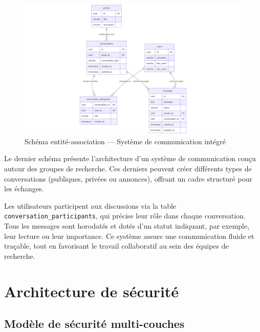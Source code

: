 \documentclass[12pt]{rapportPfe}
\begin{document}
\begin{figure}[H]
    \centering
    \includegraphics[width=1.0\textwidth]{diagrams/diagram8.png}
    \caption{Schéma entité-association — Système de communication intégré}
    \label{fig:diagram8}
\end{figure}

Le dernier schéma présente l’architecture d’un système de communication conçu autour des groupes de recherche. Ces derniers peuvent créer différents types de conversations (publiques, privées ou annonces), offrant un cadre structuré pour les échanges. 

Les utilisateurs participent aux discussions via la table \texttt{conversation\_participants}, qui précise leur rôle dans chaque conversation. Tous les messages sont horodatés et dotés d’un statut indiquant, par exemple, leur lecture ou leur importance. Ce système assure une communication fluide et traçable, tout en favorisant le travail collaboratif au sein des équipes de recherche.

\FloatBarrier
\newpage
\section{Architecture de sécurité}

\subsection{Modèle de sécurité multi-couches}
\end{document}
